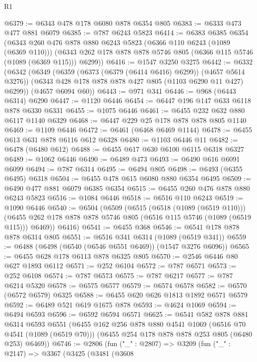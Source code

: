 \begin{lexlean}{R1}
\begin{coremodule}
@6379 := @6343 @478 @178 @6080 @878 @6354 @805
@6383 := @6333 @473 @477 @881 @6079
@6385 := @787 @6243 @5823
@6414 := @6383
    @6385
    @6354
    (@6343
      @260
      @476
      @878
      @880
      @6243
      @5823
      (@6366 @110 @6243 (@1089 (@6369 @110)))
      (@6343 @262 @178 @878 @878 @5746 @805 (@6366 @115 @5746 (@1089 (@6369 @115))) @6299))
@6416 := @1547 @3250 @3275
@6442 := @6332
    (@6342
      (@6349
        (@6359 (@6373 (@6379 (@6414 @6416) @6299)) (@4657 @5614 @3276))
        (@6343 @428 @178 @878 @878 @427 @805 (@1103 @6290 @11 @427) @6299))
      (@4657 @6094 @60))
@6443 := @971 @341
@6446 := @968 (@6443 @6314) @6290
@6447 := @1120 @6446
@6454 := @6447 @196 @147 @633 @6118 @878 @6330 @6331
@6455 := @1075 @6446
@6461 := @6455 @232 @632 @880 @6117 @1140 @6329
@6468 := @6447 @229 @25 @178 @878 @878 @805 @1140
@6469 := @1109 @6446
@6472 := @6461 (@6468 @6469 @1144)
@6478 := @6455 @613 @631 @878 @6116 @612 @6328
@6480 := @1103 @6446 @11
@6482 := @6478 (@6480 @612)
@6488 := @6455 @617 @630 @6100 @6115 @6318 @6327
@6489 := @1062 @6446
@6490 := @6489 @473
@6493 := @6490 @616 @6091 @6099
@6494 := @787 @6314
@6495 := @6494 @805
@6498 := @6493 (@6355 @6495) @6318
@6504 := @6455 @478 @615 @6080 @880 @6354 @6495
@6509 := @6490 @477 @881 @6079 @6385 @6354
@6515 := @6455 @260 @476 @878 @880 @6243 @5823
@6516 := @1084 @6446
@6518 := @6516 @110 @6243
@6519 := @1090 @6446
@6540 := @6504
    (@6509
      (@6515
        (@6518 (@1089 (@6519 @110)))
        (@6455 @262 @178 @878 @878 @5746 @805 (@6516 @115 @5746 (@1089 (@6519 @115))) @6469))
      @6416)
@6541 := @6455 @368
@6546 := @6541 @178 @878 @878 @6314 @805
@6551 := @6516 @341 @6314 (@1089 (@6519 @341))
@6559 := @6488 (@6498 (@6540 (@6546 @6551 @6469)) (@1547 @3276 @6096))
@6565 := @6455 @628 @178 @6113 @878 @6325 @805
@6570 := @2546 @6446 @80 @627 @1893 @6112
@6571 := @252 @6104
@6572 := @787 @6571
@6573 := @252 @6108
@6574 := @787 @6573
@6575 := @787 @6217
@6577 := @787 @6214 @5320
@6578 := @6575 @6577
@6579 := @6574 @6578
@6582 := @6570 (@6572 @6579) @6325
@6588 := @6455 @620 @626 @1813 @1892 @6571 @6579
@6592 := @6489 @521 @619 @1675 @878
@6593 := @4624 @1069
@6594 := @6494 @6593
@6596 := @6592 @6594 @6571
@6625 := @6541
    @582
    @878
    @881
    @6314
    @6593
    @6551
    (@6455
      @162
      @256
      @878
      @880
      @4541
      @1069
      (@6516 @70 @4541 (@1089 (@6519 @70)))
      (@6455 @254 @178 @878 @878 @253 @805 (@6480 @253) @6469))
@6746 := @2806
    (fun ("_" : @2807) =>
    @3209
      (fun ("_" : @2147) =>
      @3367
        (@3425
          (@3481
            (@3608

\end{coremodule}
\end{lexlean}
